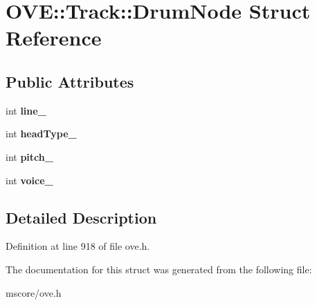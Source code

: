 \hypertarget{struct_o_v_e_1_1_track_1_1_drum_node}{}\section{O\+VE\+:\+:Track\+:\+:Drum\+Node Struct Reference}
\label{struct_o_v_e_1_1_track_1_1_drum_node}
\subsection*{Public Attributes}
\begin{DoxyCompactItemize}
\item 
\mbox{\label{struct_o_v_e_1_1_track_1_1_drum_node_aa61f9cca4f801b16078f8db43f1dac85}} 
int {\bfseries line\+\_\+}
\item 
\mbox{\label{struct_o_v_e_1_1_track_1_1_drum_node_afe234e92d8921d6bec2147dbfa26d17e}} 
int {\bfseries head\+Type\+\_\+}
\item 
\mbox{\label{struct_o_v_e_1_1_track_1_1_drum_node_a5e290b5ca4607c826f6df4b997e4be4e}} 
int {\bfseries pitch\+\_\+}
\item 
\mbox{\label{struct_o_v_e_1_1_track_1_1_drum_node_a42db75f91450ee27875d455837aad014}} 
int {\bfseries voice\+\_\+}
\end{DoxyCompactItemize}


\subsection{Detailed Description}


Definition at line 918 of file ove.\+h.



The documentation for this struct was generated from the following file\+:\begin{DoxyCompactItemize}
\item 
mscore/ove.\+h\end{DoxyCompactItemize}
